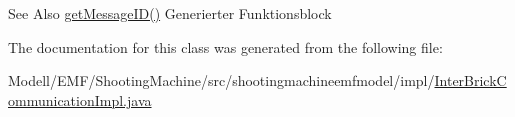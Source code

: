 \begin{DoxySeeAlso}{See Also}
\hyperlink{classshootingmachineemfmodel_1_1impl_1_1_inter_brick_communication_impl_ace5e994ef218bf1074d002ebaef563b0}{get\-Message\-I\-D()} Generierter Funktionsblock  
\end{DoxySeeAlso}


The documentation for this class was generated from the following file\-:\begin{DoxyCompactItemize}
\item 
Modell/\-E\-M\-F/\-Shooting\-Machine/src/shootingmachineemfmodel/impl/\hyperlink{_inter_brick_communication_impl_8java}{Inter\-Brick\-Communication\-Impl.\-java}\end{DoxyCompactItemize}
